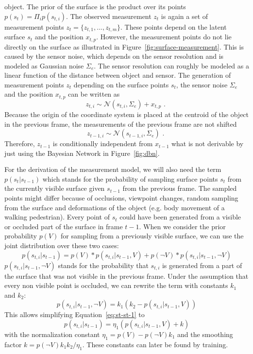 \documentclass[twoside,a4paper,article]{combine}
\begin{document}
object. The prior of the surface is the product over its points
$p(s_{t})=\Pi_i p(s_{t,i})$.
The observed measurement $z_t$ is again a set of measurement points
$z_t=\{z_{t,1}, ..., z_{t,m}\}$. These points depend on the latent
surface $s_t$ and the position $x_{t,p}$. However, the measurement
points do not lie directly on the surface as illustrated in
Figure~\ref{fig:surface-measurement}. This is caused by the sensor
noise, which depends on the sensor resolution and is modeled as
Gaussian noise $\Sigma_e$. The sensor resolution can roughly be modeled as a
linear function of the distance between object and sensor. The
generation of measurement points $z_t$ depending on the surface points
$s_t$, the sensor noise $\Sigma_e$ and the position $x_{t,p}$ can be written as
\begin{equation}
\label{eq:gaus-zt}
z_{t,i} \sim \mathcal{N}(s_{t,i},\Sigma_e) + x_{t,p} \mbox{ . }
\end{equation}
Because the origin of the coordinate system is placed at the centroid
of the object in the previous frame, the measurements of the previous
frame are not shifted
\begin{equation}
\label{eq:ind-centroid}
z_{t-1,i} \sim \mathcal{N}(s_{t-1,i},\Sigma_e) \mbox{ . }
\end{equation}
Therefore, $z_{t-1}$ is conditionally independent from $x_{t-1}$ what
is not derivable by just using the Bayesian Network in
Figure~\ref{fig:dbn}.

For the derivation of the measurement model, we will also need the
term $p(s_t|s_{t-1})$ which stands for the probability of sampling
surface points $s_t$ from the currently visible surface given
$s_{t-1}$ from the previous frame. The sampled points might differ
because of occlusions, viewpoint changes, random sampling from the
surface and deformations of the object (e.g. body movement of a
walking pedestrian). Every point of $s_t$ could have been generated
from a visible or occluded part of the surface in frame $t-1$. When we
consider the prior probability $p(V)$ for sampling from a previously
visible surface, we can use the joint distribution over these two
cases:
\begin{equation}
\label{eq:st-st-1}
p(s_{t,i}|s_{t-1})=p(V)*p(s_{t,i}|s_{t-1},V) + p(\neg V)*p(s_{t,i}|s_{t-1},\neg V)
\end{equation}
$p(s_{t,i}|s_{t-1},\neg V)$ stands for the probability that $s_{t,i}$
is generated from a part of the surface that was not visible in the
previous frame. Under the assumption that every non visible point is
occluded, we can rewrite the term with constants $k_1$ and $k_2$:
\begin{equation}
p(s_{t,i}|s_{t-1},\neg V) = k_1 (k_2 - p(s_{t,i}|s_{t-1},V))
\end{equation}
This allows simplifying Equation~\ref{eq:st-st-1} to
\begin{equation}
\label{eq:prob-surf}
p(s_{t,i}|s_{t-1})=\eta_1 (p(s_{t,i}|s_{t-1},V) + k)
\end{equation}
with the normalization constant $\eta_1=p(V)-p(\neg V) k_1$ and the
smoothing factor $k=p(\neg V)k_1k_2/\eta_1$.
These constants can later be found by training.
\end{document}
